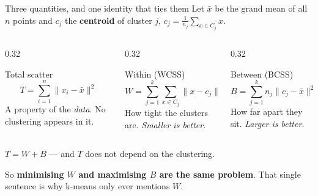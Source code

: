 \documentclass[aspectratio=169]{beamer}
\begin{document}
\begin{frame}[shrink=6]{Three quantities, and one identity that ties them}
  Let $\bar{x}$ be the grand mean of all $n$ points and $c_j$ the
  \textbf{centroid} of cluster $j$, $c_j = \frac{1}{n_j}\sum_{x \in C_j} x$.
  \begin{columns}[T]
    \begin{column}{0.32\textwidth}
      \begin{block}{Total scatter}
        \[ T = \sum_{i=1}^{n} \lVert x_i - \bar{x}\rVert^2 \]
        A property of the \emph{data}. No clustering appears in it.
      \end{block}
    \end{column}
    \begin{column}{0.32\textwidth}
      \begin{block}{Within (WCSS)}
        \[ W = \sum_{j=1}^{k}\sum_{x \in C_j} \lVert x - c_j\rVert^2 \]
        How tight the clusters are. \emph{Smaller is better.}
      \end{block}
    \end{column}
    \begin{column}{0.32\textwidth}
      \begin{block}{Between (BCSS)}
        \[ B = \sum_{j=1}^{k} n_j \lVert c_j - \bar{x}\rVert^2 \]
        How far apart they sit. \emph{Larger is better.}
      \end{block}
    \end{column}
  \end{columns}
  \vspace{0.3em}
  \begin{exampleblock}{}
    \centering\large
    $T = W + B$ \quad --- and $T$ does not depend on the clustering.
  \end{exampleblock}
  \begin{center}\small
    So \textbf{minimising $W$ and maximising $B$ are the same problem}. That
    single sentence is why k-means only ever mentions $W$.
  \end{center}
\end{frame}
\end{document}
